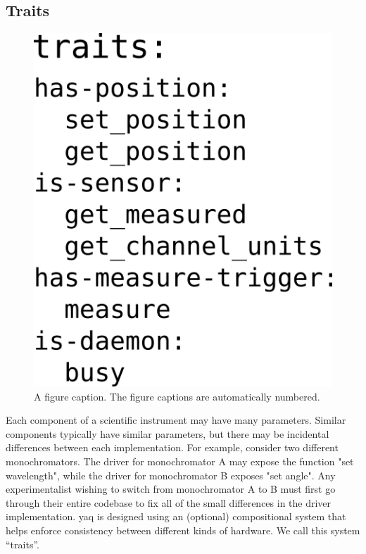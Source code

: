 \documentclass[aip, amsmath, amssymb, reprint,]{revtex4-1}
\begin{document}
\subsection{Traits}

\begin{figure}
  \includegraphics[width=\columnwidth]{./figures/traits.png}
  \caption{  \label{fig:traits} A figure caption. The figure captions are automatically numbered.}
\end{figure}

Each component of a scientific instrument may have many parameters.
Similar components typically have similar parameters, but there may be incidental differences between each implementation.
For example, consider two different monochromators.
The driver for monochromator A may expose the function "set wavelength", while the driver for monochromator B exposes "set angle".
Any experimentalist wishing to switch from monochromator A to B must first go through their entire codebase to fix all of the small differences in the driver implementation.
yaq is designed using an (optional) compositional system that helps enforce consistency between different kinds of hardware.
We call this system ``traits''.
\end{document}
